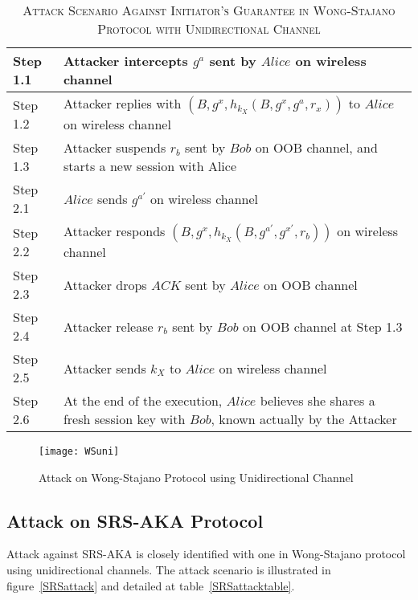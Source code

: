 \begin{table}[t]
\centering
\caption{\textsc{Attack Scenario Against Initiator's Guarantee in Wong-Stajano Protocol with Unidirectional Channel}}
\label{WSuniattack}
{\small
\begin{tabular}{| l | p{11cm} |}
 \hline
 Step 1.1 & Attacker intercepts $g^{a}$ sent by $Alice$ on wireless channel\\ \hline
 Step 1.2 & Attacker replies with $(B, g^{x}, h_{k_X}(B,g^{x},g^a,r_x))$ to $Alice$ on wireless channel\\ \hline
 Step 1.3 & Attacker suspends $r_b$ sent by $Bob$ on OOB channel, and starts a new session with Alice\\ \hline \hline
 Step 2.1 & $Alice$ sends $g^{a'}$ on wireless channel\\ \hline
 Step 2.2 & Attacker responds $(B, g^{x}, h_{k_X}(B,g^{a'},g^{x'},r_b))$ on wireless channel\\ \hline
 Step 2.3 & Attacker drops $ACK$ sent by $Alice$ on OOB channel\\ \hline
 Step 2.4 & Attacker release $r_b$ sent by $Bob$ on OOB channel at Step 1.3\\ \hline
 Step 2.5 & Attacker sends $k_X$ to $Alice$ on wireless channel\\ \hline
 Step 2.6 & At the end of the execution, $Alice$ believes she shares a fresh session key with $Bob$, known actually by the Attacker\\ \hline
\end{tabular}
}
\end{table}

\begin{figure}
  \centering
  \texttt{[image: WSuni]}
  \caption{Attack on Wong-Stajano Protocol using Unidirectional Channel}
  \label{WSuniattack}
\end{figure}

\subsection{Attack on SRS-AKA Protocol}

Attack against SRS-AKA is closely identified with one in Wong-Stajano protocol using unidirectional channels. The attack scenario is illustrated in figure~\ref{SRSattack} and detailed at table~\ref{SRSattacktable}.

